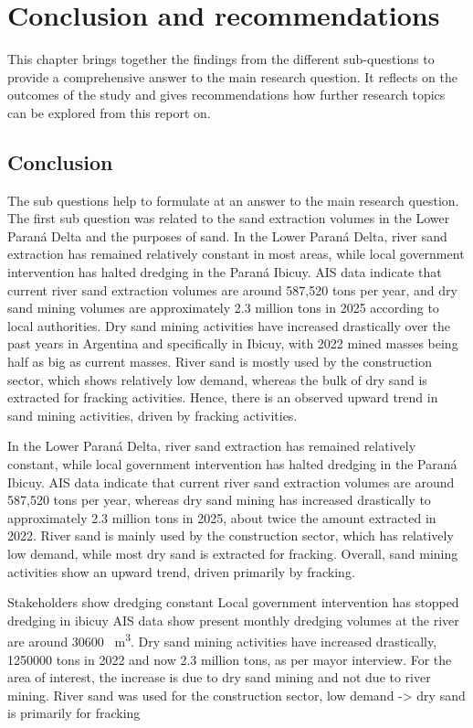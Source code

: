 \chapter{Conclusion and recommendations}
\label{chapter:conclusion}
This chapter brings together the findings from the different sub-questions to provide a comprehensive answer to the main research question. It reflects on the outcomes of the study and gives recommendations how further research topics can be explored from this report on.

\section{Conclusion}
The sub questions help to formulate at an answer to the main research question. The first sub question was related to the sand extraction volumes in the Lower Paraná Delta and the purposes of sand. In the Lower Paraná Delta, river sand extraction has remained relatively constant in most areas, while local government intervention has halted dredging in the Paraná Ibicuy. AIS data indicate that current river sand extraction volumes are around 587,520 tons per year, and dry sand mining volumes are approximately 2.3 million tons in 2025 according to local authorities. Dry sand mining activities have increased drastically over the past years in Argentina and specifically in Ibicuy, with 2022 mined masses being half as big as current masses. River sand is mostly used by the construction sector, which shows relatively low demand, whereas the bulk of dry sand is extracted for fracking activities. Hence, there is an observed upward trend in sand mining activities, driven by fracking activities.

In the Lower Paraná Delta, river sand extraction has remained relatively constant, while local government intervention has halted dredging in the Paraná Ibicuy. AIS data indicate that current river sand extraction volumes are around 587,520 tons per year, whereas dry sand mining has increased drastically to approximately 2.3 million tons in 2025, about twice the amount extracted in 2022. River sand is mainly used by the construction sector, which has relatively low demand, while most dry sand is extracted for fracking. Overall, sand mining activities show an upward trend, driven primarily by fracking.


Stakeholders show dredging constant
Local government intervention has stopped dredging in ibicuy
AIS data show present monthly dredging volumes at the river are around 30600 ~m\textsuperscript{3}. 
Dry sand mining activities have increased drastically, 1250000 tons in 2022 and now 2.3 million tons, as per mayor interview.
For the area of interest, the increase is due to dry sand mining and not due to river mining.
River sand was used for the construction sector, low demand -> dry sand is primarily for fracking




